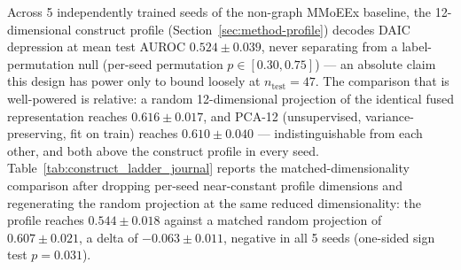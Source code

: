 \documentclass[twocolumn]{article}
\begin{document}
Across 5 independently trained seeds of the non-graph MMoEEx baseline, the 12-dimensional construct profile (Section~\ref{sec:method-profile}) decodes DAIC depression at mean test AUROC $0.524 \pm 0.039$, never separating from a label-permutation null (per-seed permutation $p \in [0.30, 0.75]$) — an absolute claim this design has power only to bound loosely at $n_{\text{test}}{=}47$. The comparison that is well-powered is relative: a random 12-dimensional projection of the identical fused representation reaches $0.616 \pm 0.017$, and PCA-12 (unsupervised, variance-preserving, fit on train) reaches $0.610 \pm 0.040$ — indistinguishable from each other, and both above the construct profile in every seed. Table~\ref{tab:construct_ladder_journal} reports the matched-dimensionality comparison after dropping per-seed near-constant profile dimensions and regenerating the random projection at the same reduced dimensionality: the profile reaches $0.544 \pm 0.018$ against a matched random projection of $0.607 \pm 0.021$, a delta of $-0.063 \pm 0.011$, negative in all 5 seeds (one-sided sign test $p{=}0.031$).

\begin{table}[t]
    \centering
    \caption{DAIC test AUROC, mean $\pm$ std over 5 seeds, for three projections of the identical fused representation under an identical fitting protocol. Top: full 12 dimensions. Bottom: after dropping per-seed near-constant profile dimensions and regenerating the random projection at matching reduced dimensionality (PCA has no analogous near-constant-dimension issue, so is reported only at full dimensionality); $\Delta$ is the degeneracy-controlled construct profile minus the matched random projection, with a subject-level bootstrap CI (2000 resamples) propagating both training-seed and test-subject sampling uncertainty.}
    \label{tab:construct_ladder_journal}
    \small
\end{table}
\end{document}
